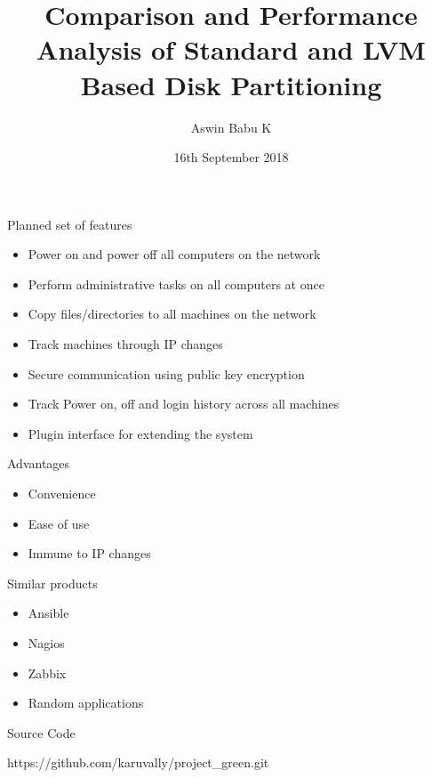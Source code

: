 \documentclass{beamer}
\title[Your Short Title]{Comparison and Performance Analysis of Standard and
LVM Based Disk Partitioning}
\author{Aswin Babu K}
\institute{College of Engineering Trivandrum}
\date{16th September 2018}
\begin{document}
\begin{frame}
    \titlepage
\end{frame}

\begin{frame}{Planned set of features}
    \begin{itemize}
        \item<2-> Power on and power off all computers on the network
        \item<3-> Perform administrative tasks on all computers at once
        \item<4-> Copy files/directories to all machines on the network
        \item<5-> Track machines through IP changes
        \item<6-> Secure communication using public key encryption
        \item<7-> Track Power on, off and login history across all machines
        \item<8-> Plugin interface for extending the system
    \end{itemize}
\end{frame}

\begin{frame}{Advantages}
    \begin{itemize}
        \item<2-> Convenience
        \item<3-> Ease of use
        \item<4-> Immune to IP changes 
    \end{itemize}
\end{frame}

\begin{frame}{Similar products}
    \begin{itemize}
        \item<2-> Ansible
        \item<3-> Nagios
        \item<4-> Zabbix
        \item<5-> Random applications
    \end{itemize}
\end{frame}

\begin{frame}{Source Code} 
    \begin{center}
        \large https://github.com/karuvally/project\_green.git
    \end{center}
\end{frame}
\end{document}
